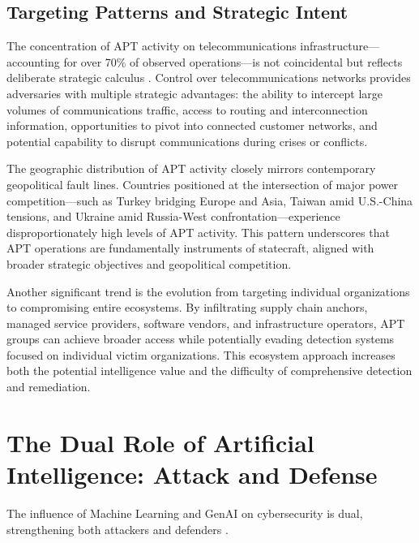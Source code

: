 \subsection{Targeting Patterns and Strategic Intent}

The concentration of APT activity on telecommunications infrastructure---accounting for over 70\% of observed operations---is not coincidental but reflects deliberate strategic calculus \cite{trellix2025}. Control over telecommunications networks provides adversaries with multiple strategic advantages: the ability to intercept large volumes of communications traffic, access to routing and interconnection information, opportunities to pivot into connected customer networks, and potential capability to disrupt communications during crises or conflicts.

The geographic distribution of APT activity closely mirrors contemporary geopolitical fault lines. Countries positioned at the intersection of major power competition---such as Turkey bridging Europe and Asia, Taiwan amid U.S.-China tensions, and Ukraine amid Russia-West confrontation---experience disproportionately high levels of APT activity. This pattern underscores that APT operations are fundamentally instruments of statecraft, aligned with broader strategic objectives and geopolitical competition.

Another significant trend is the evolution from targeting individual organizations to compromising entire ecosystems. By infiltrating supply chain anchors, managed service providers, software vendors, and infrastructure operators, APT groups can achieve broader access while potentially evading detection systems focused on individual victim organizations. This ecosystem approach increases both the potential intelligence value and the difficulty of comprehensive detection and remediation.

\section{The Dual Role of Artificial Intelligence: Attack and Defense}
The influence of Machine Learning and GenAI on cybersecurity is dual, strengthening both attackers and defenders \cite{jiang2025mitre}.

